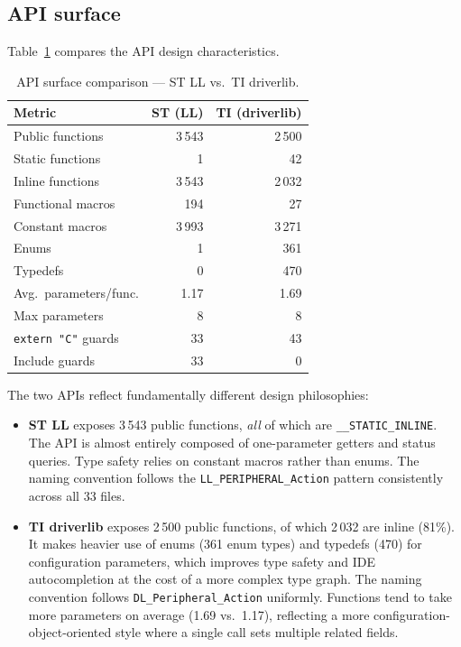 \subsection{API surface}
\label{subsec:ti-api}

Table~\ref{tab:ti-api} compares the API design characteristics.

\begin{table}[H]
\centering
\caption{API surface comparison --- ST LL vs.\ TI driverlib.}
\label{tab:ti-api}
\begin{tabular}{l r r}
\toprule
\textbf{Metric} & \textbf{ST (LL)} & \textbf{TI (driverlib)} \\
\midrule
Public functions         &    3\,543 &    2\,500 \\
Static functions         &         1 &        42 \\
Inline functions         &    3\,543 &    2\,032 \\
Functional macros        &       194 &        27 \\
Constant macros          &     3\,993 &    3\,271 \\
Enums                    &         1 &       361 \\
Typedefs                 &         0 &       470 \\
\midrule
Avg.\ parameters/func.  &      1.17 &      1.69 \\
Max parameters           &         8 &         8 \\
\texttt{extern "C"} guards &    33 &        43 \\
Include guards           &        33 &         0 \\
\bottomrule
\end{tabular}
\end{table}

The two APIs reflect fundamentally different design philosophies:

\begin{itemize}
  \item \textbf{ST LL} exposes 3\,543 public functions, \emph{all} of which are
        \texttt{\_\_STATIC\_INLINE}. The API is almost entirely composed of one-parameter
      getters and status queries.
        Type safety relies on constant macros rather than enums. The naming convention
        follows the \texttt{LL\_PERIPHERAL\_Action} pattern consistently across all 33
        files.
  \item \textbf{TI driverlib} exposes 2\,500 public functions, of which 2\,032 are inline
        (81\%). It makes heavier use of enums (361 enum types) and typedefs (470) for
        configuration parameters, which improves type safety and IDE autocompletion at the
        cost of a more complex type graph. The naming convention follows
        \texttt{DL\_Peripheral\_Action} uniformly. Functions tend to take more parameters
        on average (1.69 vs.\ 1.17), reflecting a more configuration-object-oriented
        style where a single call sets multiple related fields.
\end{itemize}

